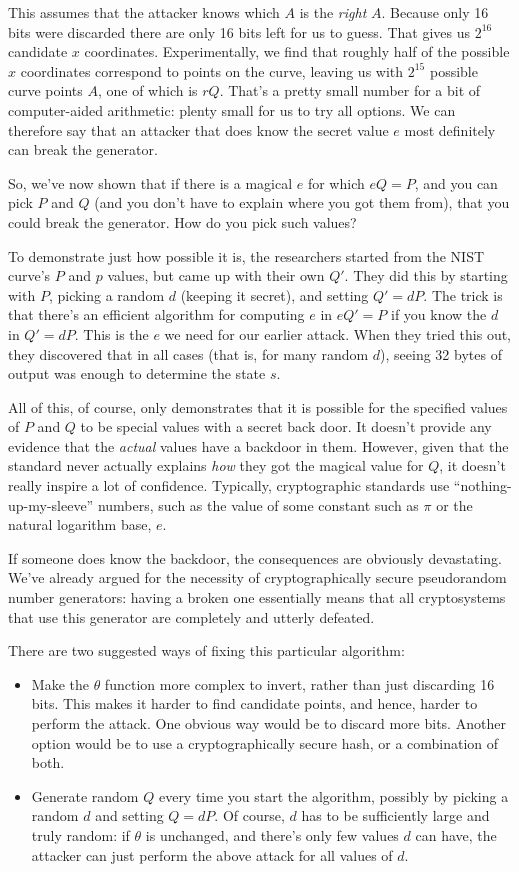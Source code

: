 \documentclass[11pt,ebook,table,dvipsnames]{memoir}
\begin{document}
This assumes that the attacker knows which $A$ is the \emph{right} $A$.
Because only 16 bits were discarded there are only 16 bits left for us
to guess. That gives us $2^{16}$ candidate $x$ coordinates.
Experimentally, we find that roughly half of the possible $x$
coordinates correspond to points on the curve, leaving us with
$2^{15}$ possible curve points $A$, one of which is $rQ$. That's a
pretty small number for a bit of computer-aided arithmetic: plenty
small for us to try all options. We can therefore say that an attacker
that does know the secret value $e$ most definitely can break the
generator.

So, we've now shown that if there is a magical $e$ for which $eQ=P$,
and you can pick $P$ and $Q$ (and you don't have to explain where you
got them from), that you could break the generator. How do you pick
such values?

To demonstrate just how possible it is, the researchers started from
the NIST curve's $P$ and $p$ values, but came up with their own $Q'$.
They did this by starting with $P$, picking a random $d$ (keeping it
secret), and setting $Q' = dP$. The trick is that there's an efficient
algorithm for computing $e$ in $eQ' = P$ if you know the $d$ in $Q' =
dP$. This is the $e$ we need for our earlier attack. When they tried
this out, they discovered that in all cases (that is, for many random
$d$), seeing 32 bytes of output was enough to determine the state $s$.

All of this, of course, only demonstrates that it is possible for the
specified values of $P$ and $Q$ to be special values with a secret
back door. It doesn't provide any evidence that the \emph{actual} values
have a backdoor in them. However, given that the standard never
actually explains \emph{how} they got the magical value for $Q$, it doesn't
really inspire a lot of confidence. Typically, cryptographic standards
use \enquote{nothing-up-my-sleeve} numbers, such as the value of some constant
such as $\pi$ or the natural logarithm base, $e$.

If someone does know the backdoor, the consequences are obviously
devastating. We've already argued for the necessity of
cryptographically secure pseudorandom number generators: having a
broken one essentially means that all cryptosystems that use this
generator are completely and utterly defeated.

There are two suggested ways of fixing this particular algorithm:

\begin{itemize}
\item Make the $\theta$ function more complex to invert, rather than just
discarding 16 bits. This makes it harder to find candidate points,
and hence, harder to perform the attack. One obvious way would be to
discard more bits. Another option would be to use a
cryptographically secure hash, or a combination of both.
\item Generate random $Q$ every time you start the algorithm, possibly by
picking a random $d$ and setting $Q = dP$. Of course, $d$ has to be
sufficiently large and truly random: if $\theta$ is unchanged, and
there's only few values $d$ can have, the attacker can just perform
the above attack for all values of $d$.
\end{itemize}
\end{document}
